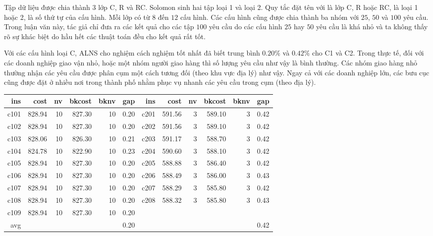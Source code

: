 Tập dữ liệu được chia thành 3 lớp C, R và RC. Solomon sinh hai tập loại 1 và loại 2. Quy tắc đặt tên  với  là lớp C, R hoặc RC,  là loại 1 hoặc 2,  là số thứ tự của cấu hình. Mỗi lớp có từ $8$ đến $12$ cấu hình. Các cấu hình cũng được chia thành ba nhóm với $25$, $50$ và $100$ yêu cầu. Trong luận văn này, tác giả chỉ đưa ra các kết quả cho các tập $100$ yêu cầu do các cấu hình $25$ hay $50$ yêu cầu là khá nhỏ và ta không thấy rõ sự khác biệt do hầu hết các thuật toán đều cho kết quả rất tốt.

Với các cấu hình loại C, ALNS cho nghiệm cách nghiệm tốt nhất đã biết trung bình $0.20\%$ và $0.42\%$ cho C1 và C2. Trong thực tế, đối với các doanh nghiệp giao vận nhỏ, hoặc một nhóm người giao hàng thì số lượng yêu cầu như vậy là bình thường. Các nhóm giao hàng nhỏ thường nhận các yêu cầu được phân cụm một cách tương đối (theo khu vực địa lý) như vậy. Ngay cả với các doanh nghiệp lớn, các bưu cục cũng được đặt ở nhiều nơi trong thành phố nhằm phục vụ nhanh các yêu cầu trong cụm (theo địa lý).

\begin{table}[caption={Kết quả đo với tập Solomon C}, label=exp:solomonC]
  \begin{adjustbox}{width=1\textwidth}
  \small
  \begin{tabularx}{\textwidth}{rrrrrrrrrrrr}
  \hline
  ins & cost & nv & bkcost & bknv & gap & ins & cost & nv & bkcost & bknv & gap \\ \hline
  c101 & 828.94 & 10 & 827.30 & 10 & 0.20 & c201 & 591.56 & 3 & 589.10 & 3 & 0.42 \\ \hline
  c102 & 828.94 & 10 & 827.30 & 10 & 0.20 & c202 & 591.56 & 3 & 589.10 & 3 & 0.42 \\ \hline
  c103 & 828.06 & 10 & 826.30 & 10 & 0.21 & c203 & 591.17 & 3 & 588.70 & 3 & 0.42 \\ \hline
  c104 & 824.78 & 10 & 822.90 & 10 & 0.23 & c204 & 590.60 & 3 & 588.10 & 3 & 0.42 \\ \hline
  c105 & 828.94 & 10 & 827.30 & 10 & 0.20 & c205 & 588.88 & 3 & 586.40 & 3 & 0.42 \\ \hline
  c106 & 828.94 & 10 & 827.30 & 10 & 0.20 & c206 & 588.49 & 3 & 586.00 & 3 & 0.43 \\ \hline
  c107 & 828.94 & 10 & 827.30 & 10 & 0.20 & c207 & 588.29 & 3 & 585.80 & 3 & 0.42 \\ \hline
  c108 & 828.94 & 10 & 827.30 & 10 & 0.20 & c208 & 588.32 & 3 & 585.80 & 3 & 0.43 \\ \hline
  c109 & 828.94 & 10 & 827.30 & 10 & 0.20 &  &  &  &  &  &  \\ \hline
  avg & & & & & 0.20 &  &  &  &  & & 0.42 \\ \hline
  \end{tabularx}
  \end{adjustbox}
  \end{table}

